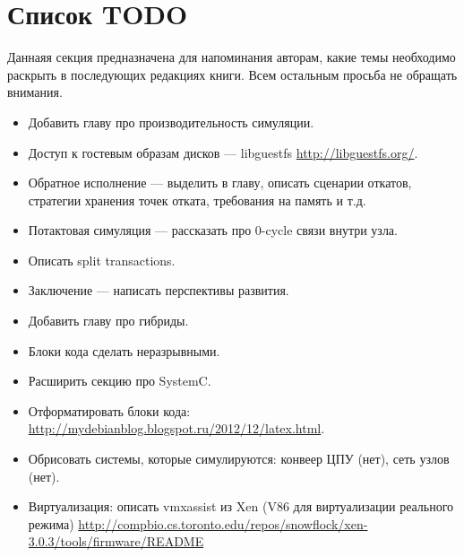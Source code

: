 \section*{Список TODO}

Даннаяя секция предназначена для напоминания авторам, какие темы необходимо раскрыть в последующих редакциях книги. Всем остальным просьба не обращать внимания.

\begin{itemize}
    \item Добавить главу про производительность симуляции.
    \item Доступ к гостевым образам дисков — libguestfs \url{http://libguestfs.org/}.
    \item Обратное исполнение — выделить в главу, описать сценарии откатов, стратегии хранения точек отката, требования на память и т.д.
    \item Потактовая симуляция — рассказать про 0-cycle связи внутри узла.
    \item Описать split transactions.
    \item Заключение — написать перспективы развития.
	\item Добавить главу про гибриды.
	\item Блоки кода сделать неразрывными.
	\item Расширить секцию про SystemC.
	\item Отформатировать блоки кода: \url{http://mydebianblog.blogspot.ru/2012/12/latex.html}.
    \item Обрисовать системы, которые симулируются: конвеер ЦПУ (нет), сеть узлов (нет).
    \item Виртуализация: описать vmxassist из Xen (V86 для виртуализации реального режима) \url{http://compbio.cs.toronto.edu/repos/snowflock/xen-3.0.3/tools/firmware/README}
\end{itemize}


 

